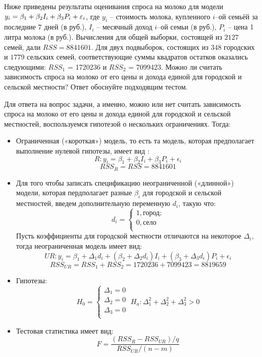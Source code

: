 \begin{problem}  %
 Ниже приведены результаты оценивания спроса на молоко для модели $y_i=\beta_1 + \beta_2 I_i + \beta_3 P_i + \varepsilon_i$, где $y_i$ -- стоимость молока, купленного $i$--ой семьёй за последние $7$ дней (в руб.), $I_i$ -- месячный доход $i$--ой семьи (в руб.), $P_i$ -- цена 1 литра молока (в руб.). Вычисления для общей выборки, состоящей из $2127$ семей, дали $RSS = 8841601$. Для двух подвыборок, состоящих из $348$ городских и $1779$ сельских семей, соответствующие суммы квадратов остатков оказались следующими: $RSS_1$ = 1720236 и $RSS_2$ = 7099423. Можно ли считать зависимость спроса на молоко от его цены и дохода единой для городской и сельской местности? Ответ обоснуйте подходящим тестом.


\begin{sol}
Для ответа на вопрос задачи, а именно, можно или нет считать зависимость спроса на молоко от его цены и дохода единой для городской и сельской местностей, воспользуемся гипотезой о нескольких ограничениях. Тогда:
\begin{itemize}
\item Ограниченная («короткая») модель, то есть та модель, которая предполагает выполнение нулевой гипотезы, имеет вид :
\[
R: y_i = \beta_1 + \beta_2I_i + \beta_3P_i + \epsilon_i
\]
\[
RSS_R = RSS = 8841601
\]
\item Для того чтобы записать спецификацию неограниченной («длинной») модели, которая пердполагает разные $\beta_i$ для городской и сельской местностей, введем дополнительную переменную $d_i$, такую что:
\[
d_i=
\begin{cases}
1, \text{город;}\\
0, \text{село}\\
\end{cases}
\]
Пусть коэффициенты для городской местности отличаются на некоторое $\Delta_i$, тогда неограниченная модель имеет вид:
\[
UR: y_i = \beta_1+\Delta_1 d_i + (\beta_2+\Delta_2 d_i)I_i + (\beta_3+\Delta_3 d_i)P_i + \epsilon_i
\]
\[
RSS_{UR} = RSS_1 + RSS_2 = 1720236 + 7099423 = 8819659
\]
\item Гипотезы:
\[
H_0=
\begin{cases}
\Delta_1=0\\
\Delta_2=0\\
\Delta_3=0\\
\end{cases} \;
H_a:\Delta_1^2+\Delta_2^2+\Delta_3^2>0
\]
\item Тестовая статистика имеет вид:
\[
F = \frac{(RSS_R-RSS_{UR})/q}{RSS_{UR}/(n-m)}
\]
\end{itemize}
\end{sol}
\end{problem}
